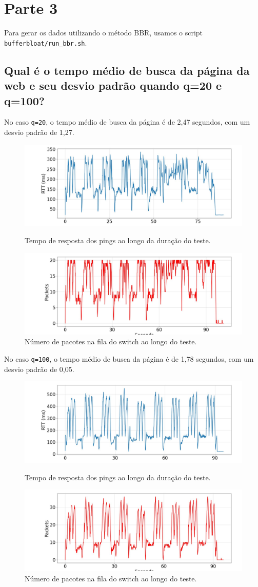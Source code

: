 \documentclass[a4paper,12pt]{article}
\newcommand{\code}[1]{\texttt{#1}}
\begin{document}
\section{Parte 3}

Para gerar os dados utilizando o método BBR, usamos o script \code{bufferbloat/run\_bbr.sh}.

\subsection{Qual é o tempo médio de busca da página da web e seu desvio padrão quando q=20 e q=100?}
No caso \code{q=20}, o tempo médio de busca da página é de 2,47 segundos, com um desvio padrão de 1,27.

\begin{figure}[h!]
  \centering
  \includegraphics[width=0.5\columnwidth]{./bufferbloat/bb-q20/bbr-rtt.jpg}
  \caption{Tempo de resposta dos pings ao longo da duração do teste.}
  \includegraphics[width=0.5\columnwidth]{./bufferbloat/bb-q20/bbr-buffer.jpg}
  \caption{Número de pacotes na fila do switch ao longo do teste.}
\end{figure}

\newpage

No caso \code{q=100}, o tempo médio de busca da página é de 1,78 segundos, com um desvio padrão de 0,05.

\begin{figure}[h!]
  \centering
  \includegraphics[width=0.5\columnwidth]{./bufferbloat/bb-q100/bbr-rtt.jpg}
  \caption{Tempo de resposta dos pings ao longo da duração do teste.}
  \includegraphics[width=0.5\columnwidth]{./bufferbloat/bb-q100/bbr-buffer.jpg}
  \caption{Número de pacotes na fila do switch ao longo do teste.}
\end{figure}
\end{document}
